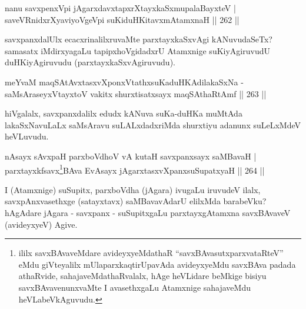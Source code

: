 
\begin{shl}
nanu savxpenxV\s pi jAgarxdavxtapxrXtayxkaSxmupalaBayxteV |\\
saveVRnidxrXyaviyoVgeV\s pi suKiduHKitavxmAtamxnaH \hfill || 262 ||
\end{shl}

\begin{artha}
savxpanxdalUlx ecacxrinalilxruvaMte parxtayxkaSxvAgi kANuvudaSeTx? samasatx iMdirxyagaLu tapipxhoVgidadxrU Atamxnige suKiyAgiruvudU duHKiyAgiruvudu (parxtayxkaSxvAgiruvudu).
\end{artha}


\begin{shl}
meYvaM maqSAtAvxtasxvXponxVtathxsuKaduHKAdilakaSxNa -\\
saMsAraseyxVtayxtoV vakitx shurxtisatxsayx maqSAthaRtAmf \hfill || 263 ||
\end{shl}

\begin{artha}
hiVgalalx, savxpanxdalilx edudx kANuva suKa-duHKa muMtAda lakaSxNavuLaLx saMsAravu suLALxdadxriMda shurxtiyu adanunx suLeLxMdeV heVLuvudu.
\end{artha}


\begin{shl}
nAsayx sAvxpaH parxboVdhoV vA kutaH savxpanxsayx saMBavaH |\\
parxtayxkfsavx\footnote{ililx savxBAvaveMdare avideyxyeMdathaR ``savxBAvasutxparxvataRteV'' eMdu giVteyalilx mUlaparxkaqtirUpavAda avideyxyeMdu savxBAva padada athaRvide, sahajaveMdathaRvalalx, hAge heVLidare beMkige bisiyu savxBAvavenunxvaMte I avasethxgaLu Atamxnige sahajaveMdu heVLabeVkAguvudu.}BAva EvAsayx jAgarxtasxvXpanxsuSupatxyaH \hfill || 264 ||
\end{shl}

\begin{artha}
I (Atamxnige) suSupitx, parxboVdha (jAgara) ivugaLu iruvudeV ilalx, savxpAnxvasethxge (satayxtavx) saMBavavAdarU elilxMda barabeVku? hAgAdare jAgara - savxpanx - suSupitxgaLu parxtayxgAtamxna savxBAvaveV (avideyxyeV) Agive.
\end{artha}



